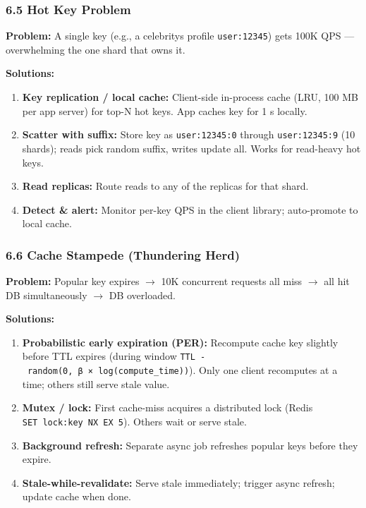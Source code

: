 \documentclass[11pt]{article}
\providecommand{\tightlist}{\setlength{\itemsep}{1pt}\setlength{\parskip}{0pt}}
\begin{document}
\subsubsection{6.5 Hot Key Problem}\label{65-hot-key-problem}

\textbf{Problem:} A single key (e.g., a celebrity\textquotesingle s profile \texttt{user:12345}) gets 100K QPS --- overwhelming the one shard that owns it.

\textbf{Solutions:}

\begin{enumerate}
\def\labelenumi{\arabic{enumi}.}
\tightlist
\item
  \textbf{Key replication / local cache:} Client-side in-process cache (LRU, 100 MB per app server) for top-N hot keys. App caches key for 1 s locally.
\item
  \textbf{Scatter with suffix:} Store key as \texttt{user:12345:0} through \texttt{user:12345:9} (10 shards); reads pick random suffix, writes update all. Works for read-heavy hot keys.
\item
  \textbf{Read replicas:} Route reads to any of the replicas for that shard.
\item
  \textbf{Detect \& alert:} Monitor per-key QPS in the client library; auto-promote to local cache.
\end{enumerate}

\subsubsection{6.6 Cache Stampede (Thundering Herd)}\label{66-cache-stampede-thundering-herd}

\textbf{Problem:} Popular key expires \(\rightarrow\) 10K concurrent requests all miss \(\rightarrow\) all hit DB simultaneously \(\rightarrow\) DB overloaded.

\textbf{Solutions:}

\begin{enumerate}
\def\labelenumi{\arabic{enumi}.}
\tightlist
\item
  \textbf{Probabilistic early expiration (PER):} Recompute cache key slightly before TTL expires (during window \texttt{TTL\ -\ random(0,\ β\ ×\ log(compute\_time))}). Only one client recomputes at a time; others still serve stale value.
\item
  \textbf{Mutex / lock:} First cache-miss acquires a distributed lock (Redis \texttt{SET\ lock:key\ NX\ EX\ 5}). Others wait or serve stale.
\item
  \textbf{Background refresh:} Separate async job refreshes popular keys before they expire.
\item
  \textbf{Stale-while-revalidate:} Serve stale immediately; trigger async refresh; update cache when done.
\end{enumerate}
\end{document}
